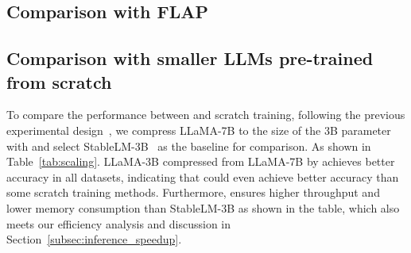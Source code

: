 \flapTable

\subsection{Comparison with FLAP}
\label{appendix:flap_comparison}


\scalingTable

\subsection{Comparison with smaller LLMs pre-trained from scratch}
\label{appendix:pretrained_comparison}
To compare the performance between \sysname and scratch training, following the previous experimental design~\citep{DBLP:conf/nips/MaFW23}, we compress LLaMA-7B to the size of the 3B parameter with \sysname and select StableLM-3B~\citep{StableLM-3B-4E1T} as the baseline for comparison. As shown in Table~\ref{tab:scaling}. LLaMA-3B compressed from LLaMA-7B by \sysname achieves better accuracy in all datasets, indicating that \sysname could even achieve better accuracy than some scratch training methods. Furthermore, \sysname ensures higher throughput and lower memory consumption than StableLM-3B as shown in the table, which also meets our efficiency analysis and discussion in Section~\ref{subsec:inference_speedup}. 



\timeTable

